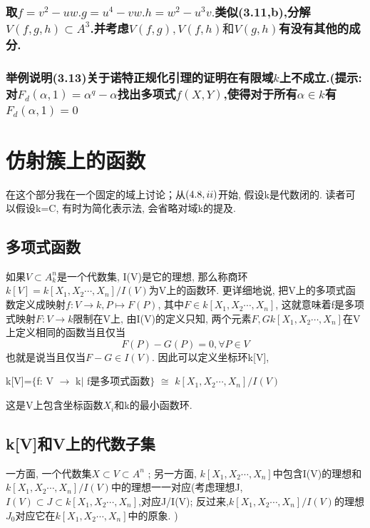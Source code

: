 \documentclass[UTF8]{book}
\begin{document}
		\subsection{取$f=v^{2}-u w . g=u^{4}-v w . h=w^{2}-u^{3} v .$类似(3.11,b),分解$V(f, g, h) \subset A^{3}$.并考虑$V(f, g), V(f, h) \text {和} V(g, h)$有没有其他的成分.}
		
		
		\subsection{举例说明(3.13)关于诺特正规化引理的证明在有限域$ k $上不成立.(提示:对$ F_{d}(\alpha,1) = \alpha^{q}-\alpha$找出多项式$ f(X,Y) $,使得对于所有$ \alpha \in k $有$ F_{d}(\alpha,1)=0 $}
		
		
\chapter{仿射簇上的函数}
	\indent 在这个部分我在一个固定的域上讨论；从$(4.8, \romannumeral2)$开始, 假设k是代数闭的. 读者可以假设k=C, 有时为简化表示法, 会省略对域k的提及.

		\section{多项式函数} 如果$V\subset A^{n}_{k}$是一个代数集, I(V)是它的理想, 那么称商环$k[V]=k[X_{1},X_{2}\cdots,X_{n}]/I(V)$为V上的函数环. 更详细地说, 把V上的多项式函数定义成映射$f:V\rightarrow k, P\mapsto F(P)$, 其中$F\in k[X_{1},X_{2}\cdots,X_{n}]$, 这就意味着f是多项式映射$F:V\rightarrow k$限制在V上, 由I(V)的定义只知, 两个元素$F,G k[X_{1},X_{2}\cdots,X_{n}]$在V上定义相同的函数当且仅当
		\begin{equation*}
		F(P)-G(P)=0, \forall  P\in V
		\end{equation*}
		也就是说当且仅当$F-G\in I(V)$. 因此可以定义坐标环k[V],

				\center  k[V]=$\{$f: V  $\rightarrow$  k$\vert$ f是多项式函数$\}$ $\cong $ $k[X_{1},X_{2}\cdots,X_{n}]/I(V)$


		\justifying
		这是V上包含坐标函数$X_{i}$和k的最小函数环.


	\section{k[V]和V上的代数子集} 一方面, 一个代数集$X\subset V\subset A^{n}$ ; 另一方面, $k[X_{1},X_{2}\cdots,X_{n}]$中包含I(V)的理想和$ k[X_{1},X_{2}\cdots,X_{n}]/I(V)$中的理想一一对应(考虑理想J,$I(V) \subset J \subset k[X_{1},X_{2}\cdots,X_{n}]$,对应J/I(V); 反过来,$k[X_{1},X_{2}\cdots,X_{n}]/I(V)$的理想$J_{0}$对应它在$k[X_{1},X_{2}\cdots,X_{n}]$中的原象. )
\end{document}
